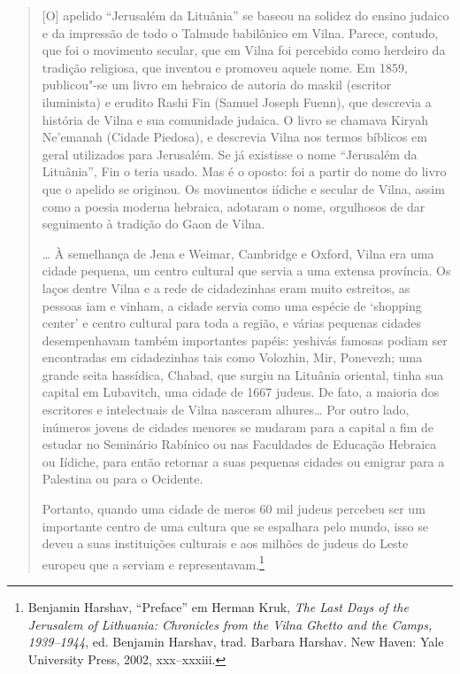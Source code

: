 \begin{quote}
{[}O{]} apelido ``Jerusalém da Lituânia'' se baseou na solidez do ensino
judaico e da impressão de todo o Talmude babilônico em Vilna. Parece,
contudo, que foi o movimento secular, que em Vilna foi percebido como
herdeiro da tradição religiosa, que inventou e promoveu aquele nome. Em
1859, publicou"-se um livro em hebraico de autoria do maskil (escritor
iluminista) e erudito Rashi Fin (Samuel Joseph Fuenn), que descrevia a
história de Vilna e sua comunidade judaica. O livro se chamava Kiryah
Ne'emanah (Cidade Piedosa), e descrevia Vilna nos termos bíblicos em
geral utilizados para Jerusalém. Se já existisse o nome ``Jerusalém da
Lituânia'', Fin o teria usado. Mas é o oposto: foi a partir do nome do
livro que o apelido se originou. Os movimentos iídiche e secular de
Vilna, assim como a poesia moderna hebraica, adotaram o nome, orgulhosos
de dar seguimento à tradição do Gaon de Vilna.

\ldots{} À semelhança de Jena e Weimar, Cambridge e Oxford, Vilna era
uma cidade pequena, um centro cultural que servia a uma extensa
província. Os laços dentre Vilna e a rede de cidadezinhas eram muito
estreitos, as pessoas iam e vinham, a cidade servia como uma espécie de
`shopping center' e centro cultural para toda a região, e várias
pequenas cidades desempenhavam também importantes papéis: yeshivás
famosas podiam ser encontradas em cidadezinhas tais como Volozhin, Mir,
Ponevezh; uma grande seita hassídica, Chabad, que surgiu na Lituânia
oriental, tinha sua capital em Lubavitch, uma cidade de 1667 judeus. De
fato, a maioria dos escritores e intelectuais de Vilna nasceram
alhures\ldots{} Por outro lado, inúmeros jovens de cidades menores se
mudaram para a capital a fim de estudar no Seminário Rabínico ou nas
Faculdades de Educação Hebraica ou Iídiche, para então retornar a suas
pequenas cidades ou emigrar para a Palestina ou para o Ocidente.

Portanto, quando uma cidade de meros 60 mil judeus percebeu ser um
importante centro de uma cultura que se espalhara pelo mundo, isso se
deveu a suas instituições culturais e aos milhões de judeus do Leste
europeu que a serviam e representavam.\footnote{Benjamin Harshav,
  ``Preface'' em Herman Kruk, \emph{The Last Days of the Jerusalem of
  Lithuania: Chronicles from the Vilna Ghetto and the Camps, 1939--1944},
  ed. Benjamin Harshav, trad. Barbara Harshav. New Haven: Yale
  University Press, 2002, xxx--xxxiii.}
\end{quote}

